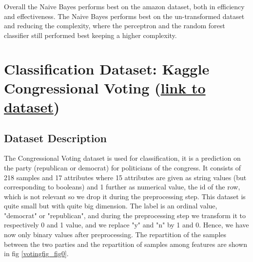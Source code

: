 \documentclass[11pt]{article}
\begin{document}
\newline
Overall the Naive Bayes performs best on the amazon dataset, both in efficiency and effectiveness. The Naive Bayes performs best on the un-transformed dataset and reducing the complexity, where the perceptron and the random forest classifier still performed best keeping a higher complexity. 

\section{Classification Dataset: Kaggle Congressional Voting (\href{https://www.kaggle.com/c/184702-tu-ml-ss-21-congressional-voting/overview}{link to dataset})}

\subsection{Dataset Description}
The Congressional Voting dataset is used for classification, it is a prediction on the party (republican or democrat) for politicians of the congress. It consists of 218 samples and 17 attributes where 15 attributes are given as string values (but corresponding to booleans) and 1 further as numerical value, the id of the row, which is not relevant so we drop it during the preprocessing step. This dataset is quite small but with quite big dimension. 
The label is an ordinal value, "democrat" or "republican", and during the preprocessing step we transform it to respectively 0 and 1 value, and we replace "y" and "n" by 1 and 0. Hence, we have now only binary values after preprocessing. The repartition of the samples between the two parties and the repartition of samples among features are shown in fig  \ref{votingfig_fig0}.
\end{document}
